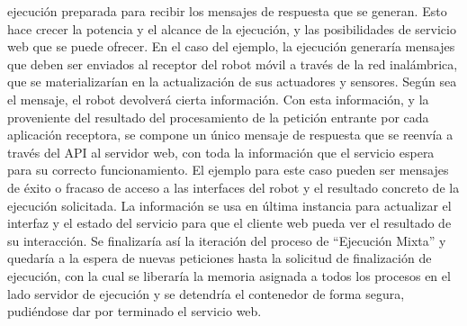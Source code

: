 ejecución preparada para recibir los mensajes de respuesta que se generan. Esto hace crecer la potencia y el alcance de la ejecución, y las posibilidades de servicio web que se puede ofrecer. En el caso del ejemplo, la ejecución generaría mensajes que deben ser enviados al receptor del robot móvil a través de la red inalámbrica, que se materializarían en la actualización de sus actuadores y sensores. Según sea el mensaje, el robot devolverá cierta información. Con esta información, y la proveniente del resultado del procesamiento de la petición entrante por cada aplicación receptora, se compone un único mensaje de respuesta que se reenvía a través del API al servidor web, con toda la información que el servicio espera para su correcto funcionamiento. El ejemplo para este caso pueden ser mensajes de éxito o fracaso de acceso a las interfaces del robot y el resultado concreto de la ejecución solicitada. La información se usa en última instancia para actualizar el interfaz y el estado del servicio para que el cliente web pueda ver el resultado de su interacción. Se finalizaría así la iteración del proceso de ``Ejecución Mixta'' y quedaría a la espera de nuevas peticiones hasta la solicitud de finalización de ejecución, con la cual se liberaría la memoria asignada a todos los procesos en el lado servidor de ejecución y se detendría el contenedor de forma segura, pudiéndose dar por terminado el servicio web.